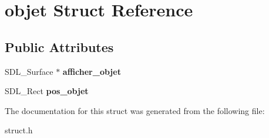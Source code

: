 \hypertarget{structobjet}{}\section{objet Struct Reference}
\label{structobjet}
\subsection*{Public Attributes}
\begin{DoxyCompactItemize}
\item 
\mbox{\label{structobjet_a75e78dd718abd857963ce550f25b32a8}} 
S\+D\+L\+\_\+\+Surface $\ast$ {\bfseries afficher\+\_\+objet}
\item 
\mbox{\label{structobjet_ac06440d9c09a3d500b8244b74ff3ae42}} 
S\+D\+L\+\_\+\+Rect {\bfseries pos\+\_\+objet}
\end{DoxyCompactItemize}


The documentation for this struct was generated from the following file\+:\begin{DoxyCompactItemize}
\item 
struct.\+h\end{DoxyCompactItemize}
